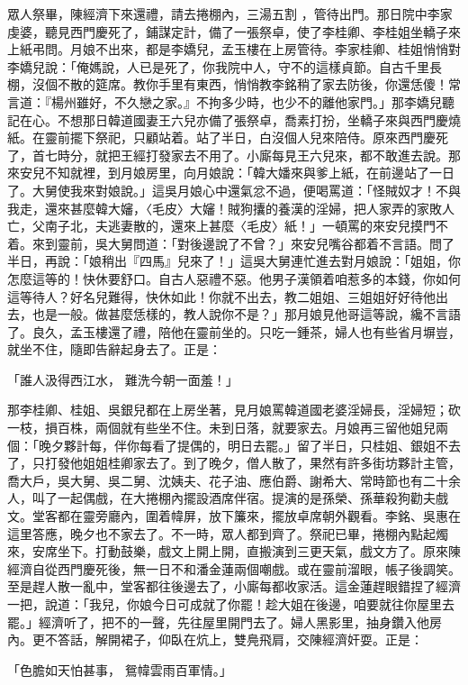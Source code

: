 眾人祭畢，陳經濟下來還禮，請去捲棚內，三湯五割 ，管待出門。那日院中李家虔婆，聽見西門慶死了，鋪謀定計，備了一張祭卓，使了李桂卿、李桂姐坐轎子來上紙弔問。月娘不出來，都是李嬌兒，孟玉樓在上房管待。李家桂卿、桂姐悄悄對李嬌兒說：「俺媽說，人已是死了，你我院中人，守不的這樣貞節。自古千里長棚，沒個不散的筵席。教你手里有東西，悄悄教李銘稍了家去防後，你還恁傻！常言道：『楊州雖好，不久戀之家。』不拘多少時，也少不的離他家門。」那李嬌兒聽記在心。不想那日韓道國妻王六兒亦備了張祭卓，喬素打扮，坐轎子來與西門慶燒紙。在靈前擺下祭祀，只顧站着。站了半日，白沒個人兒來陪侍。原來西門慶死了，首七時分，就把王經打發家去不用了。小廝每見王六兒來，都不敢進去說。那來安兒不知就裡，到月娘房里，向月娘說：「韓大嬏來與爹上紙，在前邊站了一日了。大舅使我來對娘說。」這吳月娘心中還氣忿不過，便喝罵道：「怪賊奴才！不與我走，還來甚麼韓大嬸，〈毛皮〉大嬸！賊狗攮的養漢的淫婦，把人家弄的家敗人亡，父南子北，夫逃妻散的，還來上甚麼〈毛皮〉紙！」一頓罵的來安兒摸門不着。來到靈前，吳大舅問道：「對後邊說了不曾？」來安兒嘴谷都着不言語。問了半日，再說：「娘稍出『四馬』兒來了！」這吳大舅連忙進去對月娘說：「姐姐，你怎麼這等的！快休要舒口。自古人惡禮不惡。他男子漢領着咱惹多的本錢，你如何這等待人？好名兒難得，快休如此！你就不出去，教二姐姐、三姐姐好好待他出去，也是一般。做甚麼恁樣的，教人說你不是？」那月娘見他哥這等說，纔不言語了。良久，孟玉樓還了禮，陪他在靈前坐的。只吃一鍾茶，婦人也有些省月塀豈，就坐不住，隨即告辭起身去了。正是：

「誰人汲得西江水，  難洗今朝一面羞！」

那李桂卿、桂姐、吳銀兒都在上房坐著，見月娘罵韓道國老婆淫婦長，淫婦短；砍一枝，損百株，兩個就有些坐不住。未到日落，就要家去。月娘再三留他姐兒兩個：「晚夕夥計每，伴你每看了提偶的，明日去罷。」留了半日，只桂姐、銀姐不去了，只打發他姐姐桂卿家去了。到了晚夕，僧人散了，果然有許多街坊夥計主管，喬大戶，吳大舅、吳二舅、沈姨夫、花子油、應伯爵、謝希大、常時節也有二十余人，叫了一起偶戲，在大捲棚內擺設酒席伴宿。提演的是孫榮、孫華殺狗勸夫戲文。堂客都在靈旁廳內，圍着幃屏，放下簾來，擺放卓席朝外觀看。李銘、吳惠在這里答應，晚夕也不家去了。不一時，眾人都到齊了。祭祀已畢，捲棚內點起燭來，安席坐下。打動鼓樂，戲文上開上開，直搬演到三更天氣，戲文方了。原來陳經濟自從西門慶死後，無一日不和潘金蓮兩個嘲戲。或在靈前溜眼，帳子後調笑。至是趕人散一亂中，堂客都往後邊去了，小廝每都收家活。這金蓮趕眼錯捏了經濟一把，說道：「我兒，你娘今日可成就了你罷！趁大姐在後邊，咱要就往你屋里去罷。」經濟听了，把不的一聲，先往屋里開門去了。婦人黑影里，抽身鑽入他房內。更不答話，解開裙子，仰臥在炕上，雙鳧飛肩，交陳經濟奸耍。正是：

「色膽如天怕甚事，  鴛幃雲雨百軍情。」

